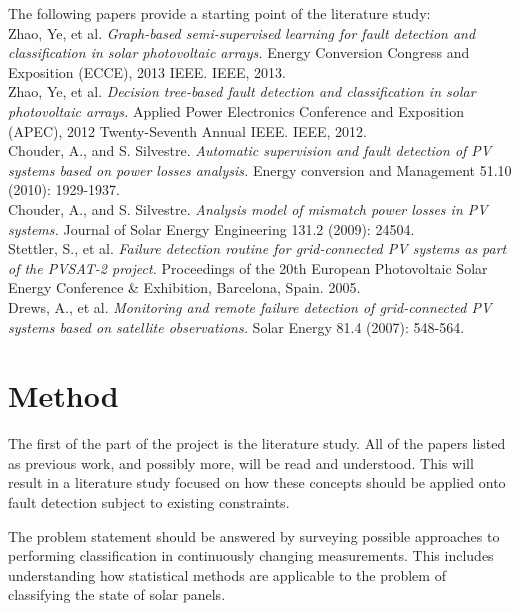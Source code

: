 \documentclass[a4paper,11pt]{article}
\begin{document}
The following papers provide a starting point of the literature study:\\

\noindent
Zhao, Ye, et al. \emph{Graph-based semi-supervised learning for fault detection and classification in solar photovoltaic arrays.} Energy Conversion Congress and Exposition (ECCE), 2013 IEEE. IEEE, 2013.\\

\noindent
Zhao, Ye, et al. \emph{Decision tree-based fault detection and classification in solar photovoltaic arrays.} Applied Power Electronics Conference and Exposition (APEC), 2012 Twenty-Seventh Annual IEEE. IEEE, 2012.\\

\noindent
Chouder, A., and S. Silvestre. \emph{Automatic supervision and fault detection of PV systems based on power losses analysis.} Energy conversion and Management 51.10 (2010): 1929-1937.\\

\noindent
Chouder, A., and S. Silvestre. \emph{Analysis model of mismatch power losses in PV systems.} Journal of Solar Energy Engineering 131.2 (2009): 24504.\\

\noindent
Stettler, S., et al. \emph{Failure detection routine for grid-connected PV systems as part of the PVSAT-2 project.} Proceedings of the 20th European Photovoltaic Solar Energy Conference \& Exhibition, Barcelona, Spain. 2005.\\

\noindent
Drews, A., et al. \emph{Monitoring and remote failure detection of grid-connected PV systems based on satellite observations.} Solar Energy 81.4 (2007): 548-564.\\

\section*{Method}
The first of the part of the project is the literature study.
All of the papers listed as previous work, and possibly more, will be read and understood.
This will result in a literature study focused on how these concepts should be applied onto fault detection subject to existing constraints.

The problem statement should be answered by surveying possible approaches to performing classification in continuously changing measurements.
This includes understanding how statistical methods are applicable to the problem of classifying the state of solar panels.
\end{document}
